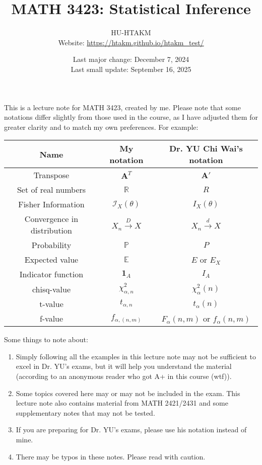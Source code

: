 \documentclass{huhtakm-template-book-v2}
\title{
	\Huge MATH 3423: Statistical Inference
}
\author{
	HU-HTAKM\\
	\small Website: \url{https://htakm.github.io/htakm_test/}
}
\date{
	Last major change: December 7, 2024\\
	Last small update: September 16, 2025
}
\DeclareMathOperator{\prob}{\mathbb{P}}
\DeclareMathOperator{\E}{\mathbb{E}}
\begin{document}
\maketitle
This is a lecture note for MATH 3423, created by me. Please note that some notations differ slightly from those used in the course, as I have adjusted them for greater clarity and to match my own preferences. For example:
\begin{table}[h]
	\centering
	\begin{tabular}{||c|c|c||}
		\hline
		Name & My notation & Dr. YU Chi Wai's notation\\
		\hline
		Transpose & $\mathbf{A}^{T}$ &  $\mathbf{A}'$\\
		Set of real numbers & $\mathbb{R}$ & $R$\\
		Fisher Information & $\mathcal{I}_{X}(\theta)$ & $I_{X}(\theta)$\\
		Convergence in distribution & $X_{n}\xrightarrow{D}X$ & $X_{n}\xrightarrow{d}X$\\
		Probability & $\prob$ & $P$\\
		Expected value & $\E$ & $E$ or $E_{X}$\\
		Indicator function & $\mathbf{1}_{A}$ & $I_{A}$\\
		chisq-value & $\chi_{\alpha,n}^{2}$ & $\chi_{\alpha}^{2}(n)$\\
		t-value & $t_{\alpha,n}$ & $t_{\alpha}(n)$\\
		f-value & $f_{\alpha,(n,m)}$ & $F_{\alpha}(n,m)$ or $f_{\alpha}(n,m)$\\
		\hline
	\end{tabular}
\end{table}

Some things to note about:
\begin{enumerate}
    \item Simply following all the examples in this lecture note may not be sufficient to excel in Dr. YU's exams, but it will help you understand the material (according to an anonymous reader who got A+ in this course (wtf)).
    \item Some topics covered here may or may not be included in the exam. This lecture note also contains material from MATH 2421/2431 and some supplementary notes that may not be tested.
    \item If you are preparing for Dr. YU's exams, please use his notation instead of mine.
    \item There may be typos in these notes. Please read with caution.
\end{enumerate}
\tableofcontents
\end{document}
